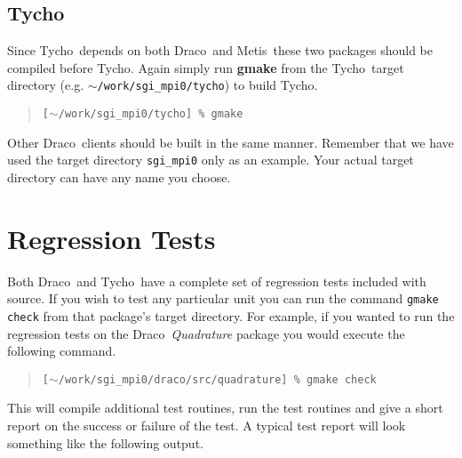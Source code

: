\documentclass[10pt]{nmemo}
\newcommand{\comp}[1]{\normalfont\normalsize\texttt{#1}}
\newcommand{\draco}{{\normalfont\sffamily Draco}}
\newcommand{\tycho}{{\normalfont\sffamily Tycho}}
\newcommand{\metis}{{\normalfont\sffamily Metis}}
\begin{document}
\subsection{\tycho}

Since \tycho\ depends on both \draco\ and \metis\ these two packages
should be compiled before \tycho.  Again simply run \textbf{gmake}
from the \tycho\ target directory (e.g. \comp{$\sim$/work/sgi\_mpi0/tycho})
to build \tycho.

\footnotesize
\begin{verse}
\texttt{[$\sim$/work/sgi\_mpi0/tycho] \% gmake}
\end{verse}
\normalsize

Other \draco\ clients should be built in the same manner.  Remember
that we have used the target directory \comp{sgi\_mpi0} only as an
example.  Your actual target directory can have any name you choose.


\section{Regression Tests}
\label{regression}

Both \draco\ and \tycho\ have a complete set of regression tests
included with source.  If you wish to test any particular unit you can
run the command \comp{gmake check} from that package's target
directory.  For example, if you wanted to run the regression tests on
the \draco\ \emph{Quadrature} package you would execute the following
command.

\footnotesize
\begin{verse}
\texttt{[$\sim$/work/sgi\_mpi0/draco/src/quadrature] \% gmake check}
\end{verse}
\normalsize

This will compile additional test routines, run the test routines
and give a short report on the success or failure of the test.  A
typical test report will look something like the following output.
\end{document}
